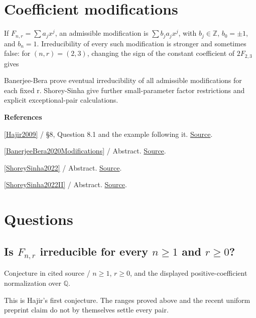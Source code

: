 \documentclass[11pt,a4paper,oneside,openany]{book}
\newcommand{\atlasdisplay}[1]{\par\begingroup\centering\vspace{3pt}\noindent\adjustbox{max width=\linewidth}{\(\displaystyle #1\)}\par\vspace{5pt}\endgroup}
\newenvironment{sources}{\par\smallskip\begingroup\footnotesize\color{atlasgray}\leftskip=10pt\setlength{\parskip}{2pt}}{\par\endgroup\smallskip}
\begin{document}
\section{Coefficient modifications}
\color{black} If \(F_{n,r}=\sum a_jx^j\), an admissible modification is \(\sum b_ja_jx^j\), with \(b_j\in\mathbb Z\), \(b_0=\pm1\), and \(b_n=1\). Irreducibility of every such modification is stronger and sometimes false: for \((n,r)=(2,3)\), changing the sign of the constant coefficient of \(2F_{2,3}\) gives\par

\atlasdisplay{x^2+8x-20=(x-2)(x+10).}
\color{black} Banerjee-Bera prove eventual irreducibility of all admissible modifications for each fixed r. Shorey-Sinha give further small-parameter factor restrictions and explicit exceptional-pair calculations.\par
\begin{sources}
\textbf{References}\par\smallskip
\noindent\hyperlink{ref:Hajir2009}{[Hajir2009]} / §8, Question 8.1 and the example following it.  \href{https://doi.org/10.4153/CJM-2009-031-6}{Source}.\par
\noindent\hyperlink{ref:BanerjeeBera2020Modifications}{[BanerjeeBera2020Modifications]} / Abstract.  \href{https://doi.org/10.1142/S1793042120500530}{Source}.\par
\noindent\hyperlink{ref:ShoreySinha2022}{[ShoreySinha2022]} / Abstract.  \href{https://doi.org/10.1016/j.indag.2022.02.006}{Source}.\par
\noindent\hyperlink{ref:ShoreySinha2022II}{[ShoreySinha2022II]} / Abstract.  \href{https://doi.org/10.1016/j.indag.2022.03.001}{Source}.\par
\end{sources}\color{black}
\section*{Questions}
\subsection*{Is \(F_{n,r}\) irreducible for every \(n\ge1\) and \(r\ge0\)?}
{\small\sffamily\color{atlasgold}Conjecture in cited source / \(n\ge1\), \(r\ge0\), and the displayed positive-coefficient normalization over \(\mathbb Q\).}\par\smallskip
\color{black} This is Hajir's first conjecture. The ranges proved above and the recent uniform preprint claim do not by themselves settle every pair.\par
\end{document}
